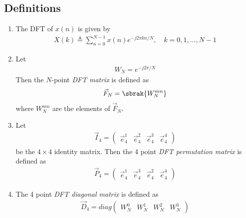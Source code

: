 \documentclass[journal,12pt,twocolumn]{IEEEtran}
\newcommand{\myvec}[1]{\ensuremath{\begin{pmatrix}#1\end{pmatrix}}}
\renewcommand\thesection{\arabic{section}}
\begin{document}
 \subsection{Definitions}
\begin{enumerate}[label=\arabic*.,ref=\thesection.\theenumi]
    \item The DFT of $x(n)$ is given by
    \begin{align}
        X(k) \triangleq \sum_{n=0}^{N-1} x(n) e^{-j 2 \pi k n / N}, \quad k=0,1, \ldots, N-1
    \end{align}
\item Let 
	\begin{align}
W_{N} = e^{-j2\pi/N} 
	\end{align}
		Then the $N$-point {\em DFT matrix} is defined as 
	\begin{align}
		\vec{F}_{N} = \sbrak{W_{N}^{mn}}
	\end{align}
	where $W_{N}^{mn}$ are the elements of $\vec{F}_{N}$.
\item Let 
	\begin{align}
		\vec{I}_4 = \myvec{\vec{e}_4^{1} &\vec{e}_4^{2} &\vec{e}_4^{3} &\vec{e}_4^{4} }
	\end{align}
		be the $4\times 4$ identity matrix.  Then the 4 point {\em DFT permutation matrix} is defined as 
	\begin{align}
		\vec{P}_4 = \myvec{\vec{e}_4^{1} &\vec{e}_4^{3} &\vec{e}_4^{2} &\vec{e}_4^{4} }
	\end{align}
\item The 4 point {\em DFT diagonal matrix} is defined as 
	\begin{align}
		\vec{D}_4 = diag\myvec{W_{N}^{0} & W_{N}^{1} & W_{N}^{2} & W_{N}^{3}}
	\end{align}
 \end{enumerate}
\end{document}
